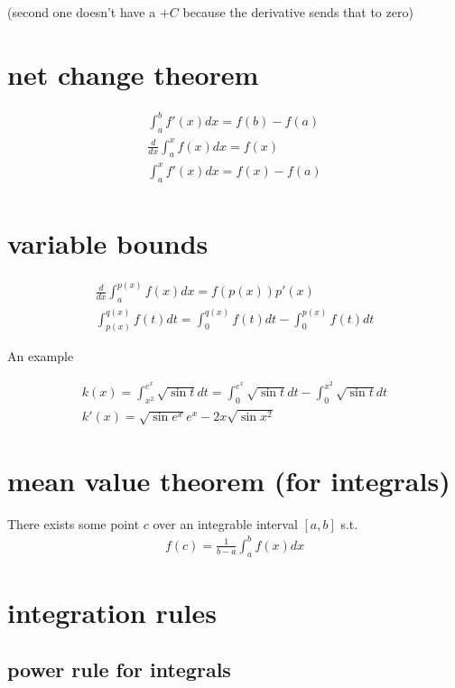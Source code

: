 \documentclass[letterpaper]{article}
\begin{document}
(second one doesn't have a \(+C\) because the derivative sends that to zero)


\section{net change theorem}
\label{sec:org01d56c5}

\[\begin{aligned}
  \int_{a}^{b} f'(x) dx = f(b) - f(a)\\
  \frac{d}{dx}\int_{a}^{x} f(x) dx = f(x)\\
  \int_{a}^{x} f'(x) dx = f(x) - f(a)\\
  \end{aligned}\]

\section{variable bounds}
\label{sec:orgde2dd1a}

\[\begin{aligned}
  \frac{d}{dx}\int_{a}^{p(x)} f(x) dx = f(p(x))p'(x)\\
  \int_{p(x)}^{q(x)} f(t)dt = \int_{0}^{q(x)} f(t)dt - \int_{0}^{p(x)} f(t)dt
  \end{aligned}\]

An example

\[\begin{aligned}
  k(x) = \int_{x^2}^{e^x} \sqrt{\sin t} dt = \int_{0}^{e^x} \sqrt{\sin t}dt - \int_{0}^{x^2} \sqrt{\sin t} dt\\
  k'(x) = \sqrt{\sin e^x}e^x - 2x\sqrt{\sin x^2}
  \end{aligned}\]

\section{mean value theorem (for integrals)}
\label{sec:orgcd23dbc}

There exists some point \(c\) over an integrable interval \([a, b]\) s.t.
\[\begin{aligned}
  f(c) = \frac{1}{b-a}\int_{a}^{b} f(x) dx
  \end{aligned}\]


\section{integration rules}
\label{sec:org30cb76f}

\subsection{power rule for integrals}
\label{sec:org6fa682c}
\end{document}
